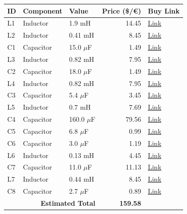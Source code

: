 \begin{table}[H]
    \centering
    \renewcommand{\arraystretch}{1.5}
    \begin{tabular}{@{}lllrl@{}}
        \toprule
        \textbf{ID} & \textbf{Component} & \textbf{Value} & \textbf{Price (\$/€)} & \textbf{Buy Link} \\
        \midrule
        L1 & Inductor & 1.9 mH & 14.45 & \href{https://www.soundimports.eu/en/jantzen-audio-000-2038.html}{Link} \\
        L2 & Inductor & 0.41 mH & 8.45 & \href{https://www.soundimports.eu/en/jantzen-audio-000-1303.html}{Link} \\
        C1 & Capacitor & 15.0 $\mu$F & 1.49 & \href{https://www.soundimports.eu/en/jantzen-audio-001-6141.html}{Link} \\
        L3 & Inductor & 0.82 mH & 7.95 & \href{https://www.soundimports.eu/en/jantzen-audio-000-2192.html}{Link} \\
        C2 & Capacitor & 18.0 $\mu$F & 1.49 & \href{https://www.soundimports.eu/en/jantzen-audio-001-6144.html}{Link} \\
        L4 & Inductor & 0.82 mH & 7.95 & \href{https://www.soundimports.eu/en/jantzen-audio-000-2192.html}{Link} \\
        C3 & Capacitor & 5.4 $\mu$F & 3.45 & \href{https://www.soundimports.eu/en/jantzen-audio-001-0253.html}{Link} \\
        L5 & Inductor & 0.7 mH & 7.69 & \href{https://www.parts-express.com/Dayton-Audio-LW18-70-0.70mH-18-AWG-Perfect-Layer-Inductor-257-820}{Link} \\
        C4 & Capacitor & 160.0 $\mu$F & 79.56 & \href{https://www.parts-express.com/Solen-160uF-400V-Polypropylene-Capacitor-027-626}{Link} \\
        C5 & Capacitor & 6.8 $\mu$F & 0.99 & \href{https://www.soundimports.eu/en/jantzen-audio-001-6029.html}{Link} \\
        C6 & Capacitor & 3.0 $\mu$F & 1.19 & \href{https://www.parts-express.com/Solen-3.0uF-400V-Polypropylene-Capacitor-027-542}{Link} \\
        L6 & Inductor & 0.13 mH & 4.45 & \href{https://www.soundimports.eu/en/dayton-audio-lw18-13.html}{Link} \\
        C7 & Capacitor & 11.0 $\mu$F & 11.13 & \href{https://www.parts-express.com/Solen-11uF-400V-Polypropylene-Capacitor-027-571}{Link} \\
        L7 & Inductor & 0.44 mH & 8.45 & \href{https://www.soundimports.eu/en/jantzen-audio-000-1191.html}{Link} \\
        C8 & Capacitor & 2.7 $\mu$F & 0.89 & \href{https://www.parts-express.com/2.7uF-100V-Non-Polarized-Capacitor-027-326}{Link} \\
        \midrule
        \multicolumn{3}{r}{\textbf{Estimated Total}} & \textbf{159.58} & \\
        \bottomrule
    \end{tabular}
\end{table}

